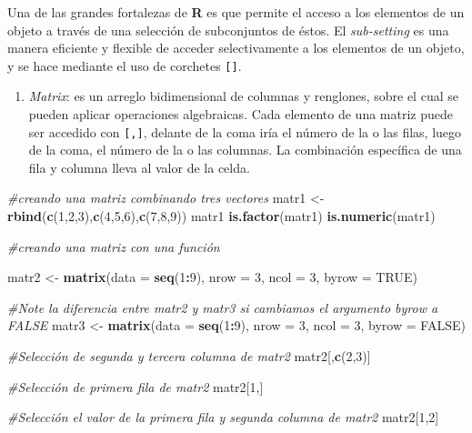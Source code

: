 \documentclass[
]{article}
\newenvironment{Shaded}{\begin{snugshade}}{\end{snugshade}}
\newcommand{\CommentTok}[1]{\textcolor[rgb]{0.56,0.35,0.01}{\textit{#1}}}
\newcommand{\DataTypeTok}[1]{\textcolor[rgb]{0.13,0.29,0.53}{#1}}
\newcommand{\DecValTok}[1]{\textcolor[rgb]{0.00,0.00,0.81}{#1}}
\newcommand{\KeywordTok}[1]{\textcolor[rgb]{0.13,0.29,0.53}{\textbf{#1}}}
\newcommand{\NormalTok}[1]{#1}
\newcommand{\OperatorTok}[1]{\textcolor[rgb]{0.81,0.36,0.00}{\textbf{#1}}}
\newcommand{\OtherTok}[1]{\textcolor[rgb]{0.56,0.35,0.01}{#1}}
\newcommand{\StringTok}[1]{\textcolor[rgb]{0.31,0.60,0.02}{#1}}
\providecommand{\tightlist}{%
  \setlength{\itemsep}{0pt}\setlength{\parskip}{0pt}}
\begin{document}
Una de las grandes fortalezas de \textbf{R} es que permite el acceso a
los elementos de un objeto a través de una selección de subconjuntos de
éstos. El \emph{sub-setting} es una manera eficiente y flexible de
acceder selectivamente a los elementos de un objeto, y se hace mediante
el uso de corchetes \texttt{{[}{]}}.

\begin{enumerate}
\def\labelenumi{\Alph{enumi})}
\setcounter{enumi}{1}
\tightlist
\item
  \emph{Matrix}: es un arreglo bidimensional de columnas y renglones,
  sobre el cual se pueden aplicar operaciones algebraicas. Cada elemento
  de una matriz puede ser accedido con \texttt{{[},{]}}, delante de la
  coma iría el número de la o las filas, luego de la coma, el número de
  la o las columnas. La combinación específica de una fila y columna
  lleva al valor de la celda.
\end{enumerate}

\begin{Shaded}
\begin{Highlighting}[]
\CommentTok{#creando una matriz combinando tres vectores}
\NormalTok{matr1 <-}\StringTok{ }\KeywordTok{rbind}\NormalTok{(}\KeywordTok{c}\NormalTok{(}\DecValTok{1}\NormalTok{,}\DecValTok{2}\NormalTok{,}\DecValTok{3}\NormalTok{),}\KeywordTok{c}\NormalTok{(}\DecValTok{4}\NormalTok{,}\DecValTok{5}\NormalTok{,}\DecValTok{6}\NormalTok{),}\KeywordTok{c}\NormalTok{(}\DecValTok{7}\NormalTok{,}\DecValTok{8}\NormalTok{,}\DecValTok{9}\NormalTok{))}
\NormalTok{matr1}
\KeywordTok{is.factor}\NormalTok{(matr1)}
\KeywordTok{is.numeric}\NormalTok{(matr1)}

\CommentTok{#creando una matriz con una función}

\NormalTok{matr2 <-}\StringTok{ }\KeywordTok{matrix}\NormalTok{(}\DataTypeTok{data =} \KeywordTok{seq}\NormalTok{(}\DecValTok{1}\OperatorTok{:}\DecValTok{9}\NormalTok{), }\DataTypeTok{nrow =} \DecValTok{3}\NormalTok{, }\DataTypeTok{ncol =} \DecValTok{3}\NormalTok{, }\DataTypeTok{byrow =} \OtherTok{TRUE}\NormalTok{)}

\CommentTok{#Note la diferencia entre matr2 y matr3 si cambiamos el argumento byrow a FALSE}
\NormalTok{matr3 <-}\StringTok{ }\KeywordTok{matrix}\NormalTok{(}\DataTypeTok{data =} \KeywordTok{seq}\NormalTok{(}\DecValTok{1}\OperatorTok{:}\DecValTok{9}\NormalTok{), }\DataTypeTok{nrow =} \DecValTok{3}\NormalTok{, }\DataTypeTok{ncol =} \DecValTok{3}\NormalTok{, }\DataTypeTok{byrow =} \OtherTok{FALSE}\NormalTok{)}

\CommentTok{#Selección de segunda y tercera columna de matr2}
\NormalTok{matr2[,}\KeywordTok{c}\NormalTok{(}\DecValTok{2}\NormalTok{,}\DecValTok{3}\NormalTok{)]}

\CommentTok{#Selección de primera fila de matr2}
\NormalTok{matr2[}\DecValTok{1}\NormalTok{,]}

\CommentTok{#Selección el valor de la primera fila y segunda columna de matr2}
\NormalTok{matr2[}\DecValTok{1}\NormalTok{,}\DecValTok{2}\NormalTok{]}
\end{Highlighting}
\end{Shaded}
\end{document}

